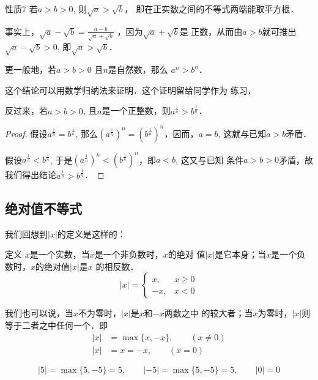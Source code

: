 \begin{blk}{性质7}
    若$a>b>0$, 则$\sqrt{a}>\sqrt{b}$，
 即在正实数之间的不等式两端能取平方根．
\end{blk}

事实上，$\sqrt{a}-\sqrt{b}=\frac{a-b}{\sqrt{a}+\sqrt{b}}$
，因为$\sqrt{a}+\sqrt{b}$是
正数，从而由$a>b$就可推出$\sqrt{a}-\sqrt{b}>0$, 即$\sqrt{a}>\sqrt{b}$．

更一般地，若$a>b>0$ 且$n$是自然数，那么
$a^n>b^n$．

这个结论可以用数学归纳法来证明．这个证明留给同学作为
练习．

反过来，若$a>b>0$, 且$n$是一个正整数，则$a^{\tfrac{1}{n}}>b^{\tfrac{1}{n}}$．

\begin{proof}
    假设$a^{\tfrac{1}{n}}=b^{\tfrac{1}{n}}$, 那么$\left(a^{\tfrac{1}{n}}\right)^n=\left(b^{\tfrac{1}{n}}\right)^n$，因而，$a=b$, 这就与已知$a>b$矛盾．

假设$a^{\tfrac{1}{n}}<b^{\tfrac{1}{n}}$, 于是$\left(a^{\tfrac{1}{n}}\right)^n<\left(b^{\tfrac{1}{n}}\right)^n$，即$a<b$, 这又与已知
条件$a>b>0$矛盾，故我们得出结论$a^{\tfrac{1}{n}}>b^{\tfrac{1}{n}}$．
\end{proof}


\subsection{绝对值不等式}
我们回想到$|x|$的定义是这样的：

\begin{blk}{定义}
$x$是一个实数，当$x$是一个非负数时，$x$的绝对
值$|x|$是它本身；当$x$是一个负数时，$x$的绝对值$|x|$是$x$
的相反数．
\begin{equation}
|x|=\begin{cases}
    x,&x\ge 0\\
    -x,&x<0
\end{cases}
\end{equation}
\end{blk}

我们也可以说，当$x$不为零时，$|x|$是$x$和$-x$两数之中
的较大者；当$x$为零时，$|x|$则等于二者之中任何一个．即
\begin{equation}
    \begin{split}
        |x|&=\max\{x,-x\},\qquad (x\ne 0)\\
        |x|&=x=-x,\qquad (x=0)
    \end{split}
\end{equation}

\begin{example}
\[|5|=\max\{5,-5\}=5,\qquad |-5|=\max\{5,-5\}=5,\qquad |0|=0\]
\end{example}

